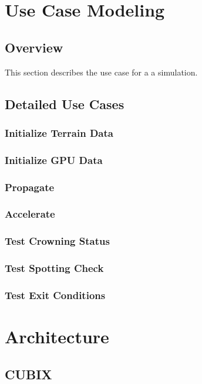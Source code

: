 \section{Use Case Modeling}
\subsection{Overview}
This section describes the use case for a a simulation.



\subsection{Detailed Use Cases}

\subsubsection{Initialize Terrain Data}
 

\subsubsection{Initialize GPU Data}


\subsubsection{Propagate}

\subsubsection{Accelerate}


\subsubsection{Test Crowning Status}


\subsubsection{Test Spotting Check}


\subsubsection{Test Exit Conditions}


\section{Architecture}
\subsection{CUBIX}
